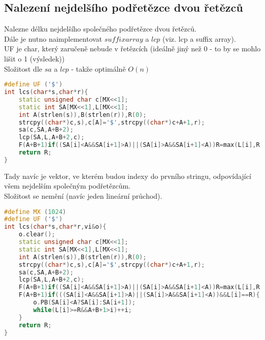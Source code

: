 \documentclass[11pt]{article}
\begin{document}
\subsection{Nalezení nejdelšího podřetězce dvou řetězců}
Nalezne délku nejdelšího společného podřetězce dvou řetězců.
\\Dále je nutno naimplementovat $suffix array$ a $lcp$ (viz. lcp a suffix array).
\\\textsf{UF} je char, který zaručeně nebude v řetězcích (ideálně jiný než 0 - to by se mohlo lišit o 1 (výsledek))
\\Složitost dle $sa$ a $lcp$ - takže optimálně $O(n)$
\begin{lstlisting}[language=C++]
#define UF ('$')
int lcs(char*s,char*r){
    static unsigned char c[MX<<1];
    static int SA[MX<<1],L[MX<<1];
    int A(strlen(s)),B(strlen(r)),R(0);
    strcpy((char*)c,s),c[A]='$',strcpy((char*)c+A+1,r);
    sa(c,SA,A+B+2);
    lcp(SA,L,A+B+2,c);
    F(A+B+1)if((SA[i]<A&&SA[i+1]>A)||(SA[i]>A&&SA[i+1]<A))R=max(L[i],R);
    return R;
}
\end{lstlisting}
Tady navíc je vektor, ve kterém budou indexy do prvního stringu, odpovídající všem nejdelším společným podřetězcům. 
\\Složitost se nemění (navíc jeden lineární průchod).
\begin{lstlisting}[language=C++]
#define MX (1024)
#define UF ('$')
int lcs(char*s,char*r,vi&o){
    o.clear();
    static unsigned char c[MX<<1];
    static int SA[MX<<1],L[MX<<1];
    int A(strlen(s)),B(strlen(r)),R(0);
    strcpy((char*)c,s),c[A]='$',strcpy((char*)c+A+1,r);
    sa(c,SA,A+B+2);
    lcp(SA,L,A+B+2,c);
    F(A+B+1)if((SA[i]<A&&SA[i+1]>A)||(SA[i]>A&&SA[i+1]<A))R=max(L[i],R);
    F(A+B+1)if(((SA[i]<A&&SA[i+1]>A)||(SA[i]>A&&SA[i+1]<A))&&L[i]==R){
        o.PB(SA[i]<A?SA[i]:SA[i+1]);
        while(L[i]>=R&&A+B+1>i)++i;
    }
    return R;
}
\end{lstlisting}
\end{document}
